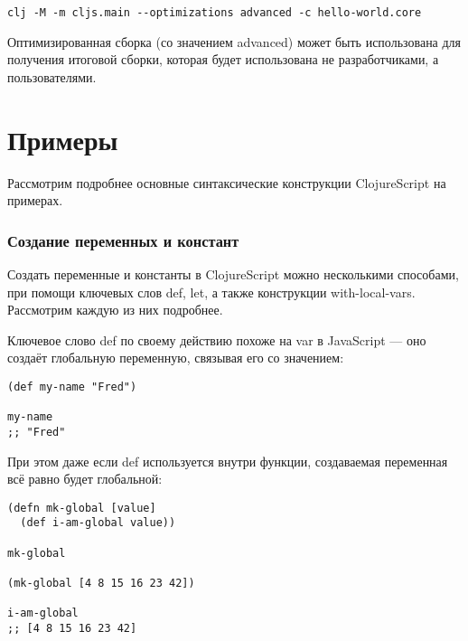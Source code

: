 \begin{center}
	\captionsetup{justification=raggedright,singlelinecheck=off}
	\begin{lstlisting}[label=lst:clojurehelloworld-3,caption=Получение оптимизированной сборки]
clj -M -m cljs.main --optimizations advanced -c hello-world.core
	\end{lstlisting}
\end{center}

Оптимизированная сборка (со значением advanced) может быть использована для получения итоговой сборки, которая будет использована не разработчиками, а пользователями.

\section*{Примеры}

Рассмотрим подробнее основные синтаксические конструкции ClojureScript на примерах.

\subsubsection*{Создание переменных и констант}

Создать переменные и константы в ClojureScript можно несколькими способами, при помощи ключевых слов def,  let, а также конструкции with-local-vars.
Рассмотрим каждую из них подробнее.

Ключевое слово def по своему действию похоже на var в JavaScript --- оно создаёт глобальную переменную, связывая его со значением:

\begin{center}
	\captionsetup{justification=raggedright,singlelinecheck=off}
	\begin{lstlisting}[label=lst:var_usage,caption=Использование var]
(def my-name "Fred")                                     

my-name
;; "Fred"
	\end{lstlisting}
\end{center}

При этом даже если def используется внутри функции, создаваемая переменная всё равно будет глобальной:

\begin{center}
	\captionsetup{justification=raggedright,singlelinecheck=off}
	\begin{lstlisting}[label=lst:var_usage_in_function,caption=Использование var внутри функции]
(defn mk-global [value]
  (def i-am-global value))

mk-global                                                 

(mk-global [4 8 15 16 23 42])

i-am-global                                                
;; [4 8 15 16 23 42]
	\end{lstlisting}
\end{center}

